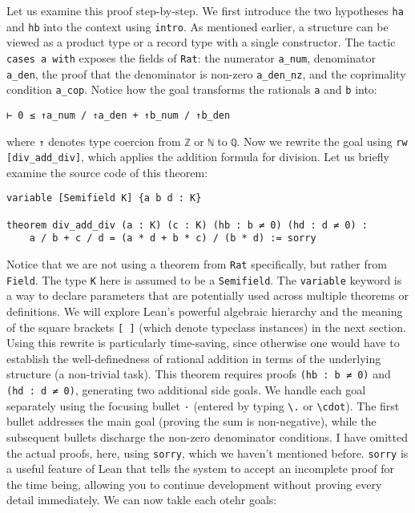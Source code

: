 \begin{example}
Let us examine this proof step-by-step.
We first introduce the two hypotheses \lstinline[language=lean]|ha| and \lstinline[language=lean]|hb| into the context using \lstinline[language=lean]|intro|. As mentioned earlier, a structure can be viewed as a product type or a record type with a single constructor. The tactic \lstinline[language=lean]|cases a with| exposes the fields of \lstinline[language=lean]|Rat|: the numerator \lstinline[language=lean]|a_num|, denominator \lstinline[language=lean]|a_den|, the proof that the denominator is non-zero \lstinline[language=lean]|a_den_nz|, and the coprimality condition \lstinline[language=lean]|a_cop|. Notice how the goal transforms the rationals \lstinline[language=lean]|a| and \lstinline[language=lean]|b| into:
\begin{lstlisting}[language=lean]
⊢ 0 ≤ ↑a_num / ↑a_den + ↑b_num / ↑b_den
\end{lstlisting}
where \lstinline[language=lean]|↑| denotes type coercion from \lstinline[language=lean]|ℤ| or \lstinline[language=lean]|ℕ| to \lstinline[language=lean]|ℚ|.
Now we rewrite the goal using \lstinline[language=lean]|rw [div_add_div]|, which applies the addition formula for division.
Let us briefly examine the source code of this theorem:
\begin{lstlisting}[language=lean]
variable [Semifield K] {a b d : K}

theorem div_add_div (a : K) (c : K) (hb : b ≠ 0) (hd : d ≠ 0) :
    a / b + c / d = (a * d + b * c) / (b * d) := sorry
\end{lstlisting}
Notice that we are not using a theorem from \lstinline[language=lean]|Rat| 
specifically, but rather from \lstinline[language=lean]|Field|. 
The type \lstinline[language=lean]|K| here is assumed to be a 
\lstinline[language=lean]|Semifield|. The \lstinline[language=lean]|variable| 
keyword is a way to declare parameters that are potentially used across 
multiple theorems or definitions. We will explore Lean's powerful algebraic 
hierarchy and the meaning of the square brackets \lstinline[language=lean]|[ ]| 
(which denote typeclass instances) in the next section.
Using this rewrite is particularly time-saving, since otherwise one would have to 
establish the well-definedness of rational addition in terms of the underlying 
structure (a non-trivial task).
This theorem requires proofs \lstinline[language=lean]|(hb : b ≠ 0)| and 
\lstinline[language=lean]|(hd : d ≠ 0)|, generating two additional side goals. 
We handle each goal separately using the focusing bullet \lstinline[language=lean]|·| 
(entered by typing \texttt{\textbackslash.} or \texttt{\textbackslash cdot}). 
The first bullet addresses the main goal (proving the sum is non-negative), 
while the subsequent bullets discharge the non-zero denominator conditions.
I have omitted the actual proofs, here, using \lstinline[language=lean]|sorry|, 
which we haven't mentioned before. \lstinline[language=lean]|sorry| is a useful 
feature of Lean that tells the system to accept an incomplete proof for the time being, 
allowing you to continue development without proving every detail immediately.
We can now takle each otehr goals:
\newpage


\end{example}
